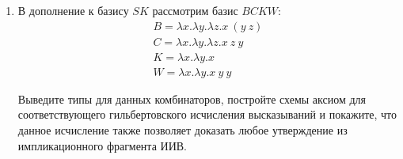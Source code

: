 \documentclass[10pt,a4paper,oneside]{article}
\begin{document}
\begin{enumerate}
Давайте теперь изобразим вывод типа (для экономии места мы не указываем вывод типов для комбинаторов
S и K).

$$\infer{\vdash S\ K\ K : \alpha\rightarrow\alpha}
{\vdash K:\alpha\rightarrow\alpha\rightarrow\alpha &
   \infer{\vdash S\ K: (\alpha\rightarrow\alpha\rightarrow\alpha)\rightarrow(\alpha\rightarrow\alpha)}
         {\vdash K : \alpha\rightarrow(\alpha\rightarrow\alpha)\rightarrow\alpha &
          \vdash S : (\alpha\rightarrow(\alpha\rightarrow\alpha)\rightarrow\alpha)\rightarrow(\alpha\rightarrow\alpha\rightarrow\alpha)\rightarrow(\alpha\rightarrow\alpha)
         }
}$$

Осталось заметить, что действительно $I =_\beta S\ K\ K$.

На основе изложенного, постройте доказательства следующих утверждений в гильбертовском стиле и
выразите соответствующие выражения с помощью комбинаторов $S$ и $K$:

\begin{enumerate}
\item $\alpha\rightarrow\beta\rightarrow\beta$
\item $(\alpha\rightarrow\beta)\rightarrow\alpha\rightarrow\beta$
\item $(\alpha\rightarrow\alpha\rightarrow\beta)\rightarrow(\alpha\rightarrow\beta)$
\item $(\alpha\rightarrow\beta\rightarrow\gamma)\rightarrow(\beta\rightarrow\alpha\rightarrow\gamma)$
\end{enumerate}

\item В дополнение к базису $SK$ рассмотрим базис $BCKW$: 
$$\begin{array}{l}B = \lambda x.\lambda y.\lambda z.x\ (y\ z)\\
C = \lambda x.\lambda y.\lambda z.x\ z\ y\\
K = \lambda x.\lambda y.x\\
W = \lambda x.\lambda y.x\ y\ y\end{array}$$

Выведите типы для данных комбинаторов, постройте схемы аксиом для соответствующего гильбертовского исчисления
высказываний и покажите, что данное исчисление также позволяет доказать любое утверждение из импликационного
фрагмента ИИВ.
\end{enumerate}
\end{document}
